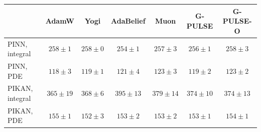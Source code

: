 \begin{tabular}{lcccccc}
\toprule
 & AdamW & Yogi & AdaBelief & Muon & G-PULSE & G-PULSE-O\\
\midrule
PINN, integral & $258\pm1$ & $258\pm0$ & $254\pm1$ & $257\pm3$ & $256\pm1$ & $258\pm3$\\
PINN, PDE & $118\pm3$ & $119\pm1$ & $121\pm4$ & $123\pm3$ & $119\pm2$ & $123\pm2$\\
PIKAN, integral & $365\pm19$ & $368\pm6$ & $395\pm13$ & $379\pm14$ & $374\pm10$ & $374\pm13$\\
PIKAN, PDE & $155\pm1$ & $152\pm3$ & $153\pm2$ & $153\pm2$ & $153\pm1$ & $154\pm1$\\
\bottomrule
\end{tabular}